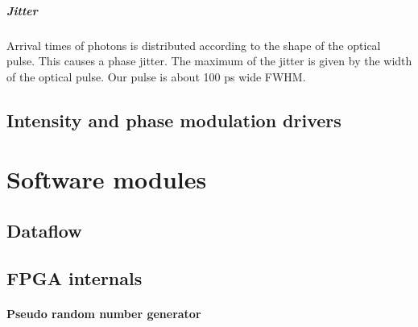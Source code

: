 \subparagraph{Jitter}

Arrival times of photons is distributed according to the shape of the
optical pulse. This causes a phase jitter. The maximum of the jitter
is given by the width of the optical pulse. Our pulse is about 100 ps
wide FWHM.

\subsection{Intensity and phase modulation drivers}


\section{Software modules}

\subsection{Dataflow}

\subsection{FPGA internals}

\paragraph{Pseudo random number generator}